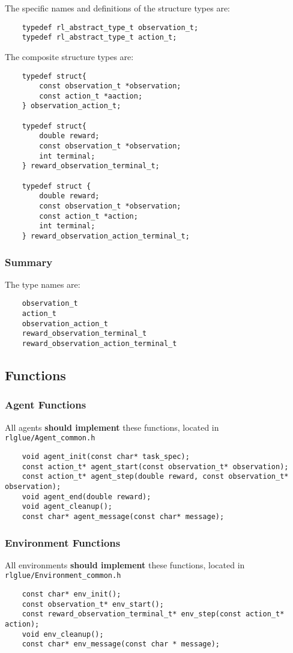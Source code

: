 \documentclass[11pt]{article}
\begin{document}
The specific names and definitions of the structure types are:
\begin{verbatim}
    typedef rl_abstract_type_t observation_t;
    typedef rl_abstract_type_t action_t;
\end{verbatim}

The composite structure types are:
\begin{verbatim}
	typedef struct{
	    const observation_t *observation;
	    const action_t *aaction;
	} observation_action_t;

	typedef struct{
	    double reward;
	    const observation_t *observation;
	    int terminal;
	} reward_observation_terminal_t;

	typedef struct {
	    double reward;
	    const observation_t *observation;
	    const action_t *action;
	    int terminal;
	} reward_observation_action_terminal_t;
\end{verbatim}

\subsubsection{Summary}
The type names are:
\begin{verbatim}
    observation_t
    action_t
    observation_action_t
    reward_observation_terminal_t
    reward_observation_action_terminal_t
\end{verbatim}


\subsection{Functions}
\subsubsection{Agent Functions}
All agents \textbf{should implement} these functions, located in \texttt{rlglue/Agent\_common.h}
\begin{verbatim}
	void agent_init(const char* task_spec);
	const action_t* agent_start(const observation_t* observation);
	const action_t* agent_step(double reward, const observation_t* observation);
	void agent_end(double reward);  
	void agent_cleanup();
	const char* agent_message(const char* message);
\end{verbatim}

\subsubsection{Environment Functions}
All environments \textbf{should implement} these functions, located in \texttt{rlglue/Environment\_common.h}
\begin{verbatim}
	const char* env_init();
	const observation_t* env_start();
	const reward_observation_terminal_t* env_step(const action_t* action);
	void env_cleanup();
	const char* env_message(const char * message);
\end{verbatim}
\end{document}
